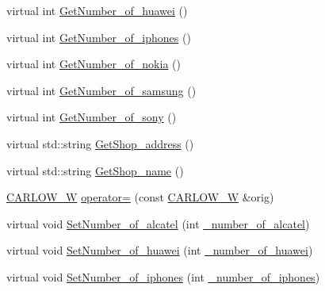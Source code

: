 \begin{DoxyCompactItemize}
\item 
virtual int \hyperlink{class_c_a_r_l_o_w___w_aea38b51a44cda35a01beb7d45fa7a2a4_aea38b51a44cda35a01beb7d45fa7a2a4}{Get\+Number\+\_\+of\+\_\+huawei} ()
\item 
virtual int \hyperlink{class_c_a_r_l_o_w___w_a50395c707116ea1176743ed98c6b1f76_a50395c707116ea1176743ed98c6b1f76}{Get\+Number\+\_\+of\+\_\+iphones} ()
\item 
virtual int \hyperlink{class_c_a_r_l_o_w___w_a4e3a644ee69bc4bc4ab3feac1493192b_a4e3a644ee69bc4bc4ab3feac1493192b}{Get\+Number\+\_\+of\+\_\+nokia} ()
\item 
virtual int \hyperlink{class_c_a_r_l_o_w___w_aecc697b6d017d88f2bdbe3cea2bf3496_aecc697b6d017d88f2bdbe3cea2bf3496}{Get\+Number\+\_\+of\+\_\+samsung} ()
\item 
virtual int \hyperlink{class_c_a_r_l_o_w___w_a6d31219dac9b4d8842e14b7414ed286e_a6d31219dac9b4d8842e14b7414ed286e}{Get\+Number\+\_\+of\+\_\+sony} ()
\item 
virtual std\+::string \hyperlink{class_c_a_r_l_o_w___w_af48a2f69706be684115758820ce79ddd_af48a2f69706be684115758820ce79ddd}{Get\+Shop\+\_\+address} ()
\item 
virtual std\+::string \hyperlink{class_c_a_r_l_o_w___w_a68235a63964645c525620053a33de863_a68235a63964645c525620053a33de863}{Get\+Shop\+\_\+name} ()
\item 
\hyperlink{class_c_a_r_l_o_w___w}{C\+A\+R\+L\+O\+W\+\_\+W} \hyperlink{class_c_a_r_l_o_w___w_a38c83795abf1751b3e122c74494f4586_a38c83795abf1751b3e122c74494f4586}{operator=} (const \hyperlink{class_c_a_r_l_o_w___w}{C\+A\+R\+L\+O\+W\+\_\+W} \&orig)
\item 
virtual void \hyperlink{class_c_a_r_l_o_w___w_ad264954806d7fd6c418650a5c7c7defb_ad264954806d7fd6c418650a5c7c7defb}{Set\+Number\+\_\+of\+\_\+alcatel} (int \hyperlink{class_c_a_r_l_o_w___w_acf1f9888b2ac011cd0e8bb49b10abd91_acf1f9888b2ac011cd0e8bb49b10abd91}{\+\_\+number\+\_\+of\+\_\+alcatel})
\item 
virtual void \hyperlink{class_c_a_r_l_o_w___w_a016d1d51b091fc1732c2923a3baa2f58_a016d1d51b091fc1732c2923a3baa2f58}{Set\+Number\+\_\+of\+\_\+huawei} (int \hyperlink{class_c_a_r_l_o_w___w_acc2837ed943bb51134e5878e818970fd_acc2837ed943bb51134e5878e818970fd}{\+\_\+number\+\_\+of\+\_\+huawei})
\item 
virtual void \hyperlink{class_c_a_r_l_o_w___w_ad58af9d68450f4fc70e0e1ecd4b1b498_ad58af9d68450f4fc70e0e1ecd4b1b498}{Set\+Number\+\_\+of\+\_\+iphones} (int \hyperlink{class_c_a_r_l_o_w___w_aff9e9a986b6390d6fa51f52d43a8c0e8_aff9e9a986b6390d6fa51f52d43a8c0e8}{\+\_\+number\+\_\+of\+\_\+iphones})

\end{DoxyCompactItemize}

